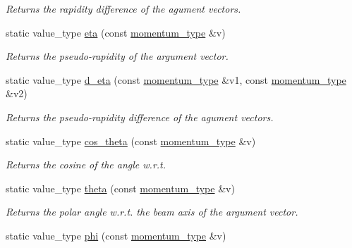 \begin{DoxyCompactItemize}
\begin{DoxyCompactList}\small\item\em Returns the rapidity difference of the agument vectors. \end{DoxyCompactList}\item 
\hypertarget{a00442_a2f10f0a4b3bb48a2fba7203ac0d53894}{static value\-\_\-type \hyperlink{a00442_a2f10f0a4b3bb48a2fba7203ac0d53894}{eta} (const \hyperlink{a00559}{momentum\-\_\-type} \&v)}\label{a00442_a2f10f0a4b3bb48a2fba7203ac0d53894}

\begin{DoxyCompactList}\small\item\em Returns the pseudo-\/rapidity of the argument vector. \end{DoxyCompactList}\item 
\hypertarget{a00442_a4754a4456aa938db797b4684a87f7a4a}{static value\-\_\-type \hyperlink{a00442_a4754a4456aa938db797b4684a87f7a4a}{d\-\_\-eta} (const \hyperlink{a00559}{momentum\-\_\-type} \&v1, const \hyperlink{a00559}{momentum\-\_\-type} \&v2)}\label{a00442_a4754a4456aa938db797b4684a87f7a4a}

\begin{DoxyCompactList}\small\item\em Returns the pseudo-\/rapidity difference of the agument vectors. \end{DoxyCompactList}\item 
static value\-\_\-type \hyperlink{a00442_a23ce70822ce213db410bb117575f9ede}{cos\-\_\-theta} (const \hyperlink{a00559}{momentum\-\_\-type} \&v)
\begin{DoxyCompactList}\small\item\em Returns the cosine of the angle w.\-r.\-t. \end{DoxyCompactList}\item 
\hypertarget{a00442_ae305e6b42040803777223eed938d1992}{static value\-\_\-type \hyperlink{a00442_ae305e6b42040803777223eed938d1992}{theta} (const \hyperlink{a00559}{momentum\-\_\-type} \&v)}\label{a00442_ae305e6b42040803777223eed938d1992}

\begin{DoxyCompactList}\small\item\em Returns the polar angle w.\-r.\-t. the beam axis of the argument vector. \end{DoxyCompactList}\item 
\hypertarget{a00442_a02e898a57394c50775153d6e55a7d842}{static value\-\_\-type \hyperlink{a00442_a02e898a57394c50775153d6e55a7d842}{phi} (const \hyperlink{a00559}{momentum\-\_\-type} \&v)}\label{a00442_a02e898a57394c50775153d6e55a7d842}


\end{DoxyCompactItemize}
